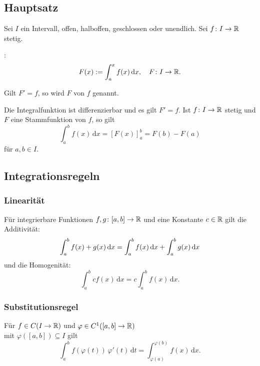 \subsection{Hauptsatz}
Sei $I$ ein Intervall, offen, halboffen, geschlossen oder unendlich.
Sei $f\colon I\to\mathbb R$ stetig.

{}
:
\begin{equation}
F(x):=\int_a^x f(x)\,\mathrm dx,\quad F\colon I\to\mathbb R.
\end{equation}

{}
Gilt $F'=f$, so wird $F$  von $f$ genannt.

Die Integralfunktion ist differenzierbar und es gilt $F'=f$.
Ist $f\colon I\to\mathbb R$ stetig und $F$ eine Stammfunktion von $f$,
so gilt
\begin{equation}\label{eq:Hauptsatz}
\int_a^b f(x)\,\mathrm dx = [F(x)]_{a}^{b} = F(b)-F(a)
\end{equation}
für $a,b\in I$.

\subsection{Integrationsregeln}
\subsubsection{Linearität}
Für integrierbare Funktionen $f,g\colon [a,b]\to\mathbb R$ und eine
Konstante $c\in\mathbb R$ gilt die Additivität:
\begin{equation}
\int_a^b f(x)+g(x)\,\mathrm dx
= \int_a^b f(x)\,\mathrm dx+\int_a^b g(x)\,\mathrm dx\\
\end{equation}
und die Homogenität:
\begin{equation}
\int_a^b c f(x)\,\mathrm dx
= c\int_a^b f(x)\,\mathrm dx.
\end{equation}

\subsubsection{Substitutionsregel}
Für $f\in C(I\to\mathbb R)$ und
$\varphi\in C^1([a,b]\to\mathbb R)$\\
mit $\varphi([a,b])\subseteq I$ gilt%
\begin{equation}
\int_a^b f(\varphi(t))\,\varphi'(t)\,\mathrm dt
= \int_{\varphi(a)}^{\varphi(b)} f(x)\,\mathrm dx.
\end{equation}
